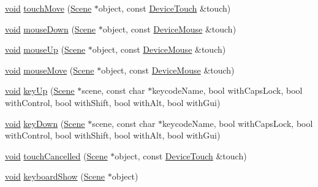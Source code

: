 \begin{DoxyCompactItemize}
\item 
\mbox{\hyperlink{_thread_8h_af1e856da2e658414cb2456cb6f7ebc66}{void}} \mbox{\hyperlink{classnjli_1_1_scene_state_ae76881dfc8ba5596113c1d35afec1b78}{touch\+Move}} (\mbox{\hyperlink{classnjli_1_1_scene}{Scene}} $\ast$object, const \mbox{\hyperlink{classnjli_1_1_device_touch}{Device\+Touch}} \&touch)
\item 
\mbox{\hyperlink{_thread_8h_af1e856da2e658414cb2456cb6f7ebc66}{void}} \mbox{\hyperlink{classnjli_1_1_scene_state_a234c9b5a8b7ea611bd38e8614ad12ae4}{mouse\+Down}} (\mbox{\hyperlink{classnjli_1_1_scene}{Scene}} $\ast$object, const \mbox{\hyperlink{classnjli_1_1_device_mouse}{Device\+Mouse}} \&touch)
\item 
\mbox{\hyperlink{_thread_8h_af1e856da2e658414cb2456cb6f7ebc66}{void}} \mbox{\hyperlink{classnjli_1_1_scene_state_a2bc77b1d7e48504e1273c82fc8c82e7d}{mouse\+Up}} (\mbox{\hyperlink{classnjli_1_1_scene}{Scene}} $\ast$object, const \mbox{\hyperlink{classnjli_1_1_device_mouse}{Device\+Mouse}} \&touch)
\item 
\mbox{\hyperlink{_thread_8h_af1e856da2e658414cb2456cb6f7ebc66}{void}} \mbox{\hyperlink{classnjli_1_1_scene_state_a2dc269f881e2685742813f56f412d36a}{mouse\+Move}} (\mbox{\hyperlink{classnjli_1_1_scene}{Scene}} $\ast$object, const \mbox{\hyperlink{classnjli_1_1_device_mouse}{Device\+Mouse}} \&touch)
\item 
\mbox{\hyperlink{_thread_8h_af1e856da2e658414cb2456cb6f7ebc66}{void}} \mbox{\hyperlink{classnjli_1_1_scene_state_a0285084af113825bd125b559f408c9f7}{key\+Up}} (\mbox{\hyperlink{classnjli_1_1_scene}{Scene}} $\ast$scene, const char $\ast$keycode\+Name, bool with\+Caps\+Lock, bool with\+Control, bool with\+Shift, bool with\+Alt, bool with\+Gui)
\item 
\mbox{\hyperlink{_thread_8h_af1e856da2e658414cb2456cb6f7ebc66}{void}} \mbox{\hyperlink{classnjli_1_1_scene_state_a411685b6b560bd62977c53cb1fc78961}{key\+Down}} (\mbox{\hyperlink{classnjli_1_1_scene}{Scene}} $\ast$scene, const char $\ast$keycode\+Name, bool with\+Caps\+Lock, bool with\+Control, bool with\+Shift, bool with\+Alt, bool with\+Gui)
\item 
\mbox{\hyperlink{_thread_8h_af1e856da2e658414cb2456cb6f7ebc66}{void}} \mbox{\hyperlink{classnjli_1_1_scene_state_abda337709547b3fd1cc5ea03632299ce}{touch\+Cancelled}} (\mbox{\hyperlink{classnjli_1_1_scene}{Scene}} $\ast$object, const \mbox{\hyperlink{classnjli_1_1_device_touch}{Device\+Touch}} \&touch)
\item 
\mbox{\hyperlink{_thread_8h_af1e856da2e658414cb2456cb6f7ebc66}{void}} \mbox{\hyperlink{classnjli_1_1_scene_state_adda084dbfb2c043d462fa37269f1deb5}{keyboard\+Show}} (\mbox{\hyperlink{classnjli_1_1_scene}{Scene}} $\ast$object)

\end{DoxyCompactItemize}
